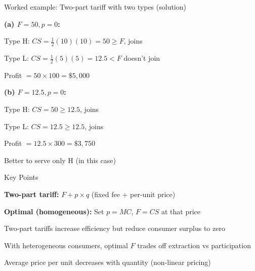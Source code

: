 \documentclass[notes,11pt, aspectratio=169]{beamer}
\newenvironment{wideitemize}{\itemize\addtolength{\itemsep}{10pt}}{\enditemize}
\newenvironment{wideenumerate}{\enumerate\addtolength{\itemsep}{10pt}}{\endenumerate}
\begin{document}
\begin{frame}{Worked example: Two-part tariff with two types (solution)}
	\begin{wideitemize}
		\item \textbf{(a) $F = 50, p = 0$:}
		\begin{wideitemize}
			\vspace{3pt}
			\item Type H: $CS = \frac{1}{2}(10)(10) = 50 \geq F$, joins
			\item Type L: $CS = \frac{1}{2}(5)(5) = 12.5 < F$ doesn't join
			\item Profit $= 50 \times 100 = \$5,000$
		\end{wideitemize}
		\item \textbf{(b) $F = 12.5, p = 0$:}
		\begin{wideitemize}
			\vspace{3pt}
			\item Type H: $CS = 50 \geq 12.5$, joins
			\item Type L: $CS = 12.5 \geq 12.5$, joins
			\item Profit $= 12.5 \times 300 = \$3,750$
		\end{wideitemize}
		\item Better to serve only H (in this case)
	\end{wideitemize}
\end{frame}


\begin{frame}{Key Points}
	\vspace{11pt}
	\begin{wideenumerate}
		\item \textbf{Two-part tariff:} $F + p \times q$ (fixed fee + per-unit price)
		\item \textbf{Optimal (homogeneous):} Set $p = MC$, $F = CS$ at that price
		\item Two-part tariffs increase efficiency but reduce consumer surplus to zero
		\item With heterogeneous consumers, optimal $F$ trades off extraction vs participation
		\item Average price per unit decreases with quantity (non-linear pricing)
	\end{wideenumerate}
\end{frame}
\end{document}
